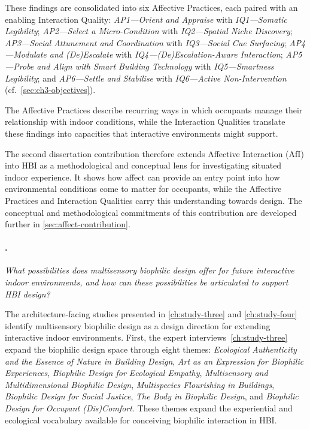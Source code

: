 These findings are consolidated into six Affective Practices, each paired with an enabling Interaction Quality:
\textit{AP1---Orient and Appraise} with
\textit{IQ1---Somatic Legibility};
\textit{AP2---Select a Micro-Condition} with
\textit{IQ2---Spatial Niche Discovery};
\textit{AP3---Social Attunement and Coordination} with
\textit{IQ3---Social Cue Surfacing};
\textit{AP4---Modulate and (De)Escalate} with
\textit{IQ4---(De)Escalation-Aware Interaction};
\textit{AP5---Probe and Align with Smart Building Technology} with
\textit{IQ5---Smartness Legibility}; and
\textit{AP6---Settle and Stabilise} with
\textit{IQ6---Active Non-Intervention} (cf.~\autoref{sec:ch3-objectives}). 

The Affective Practices describe recurring ways in which occupants manage their relationship with indoor conditions, while the Interaction Qualities translate these findings into capacities that interactive environments might support.

The second dissertation contribution therefore extends Affective Interaction (AfI) into HBI as a methodological and conceptual lens for investigating situated indoor experience. It shows how affect can provide an entry point into how environmental conditions come to matter for occupants, while the Affective Practices and Interaction Qualities carry this understanding towards design. The conceptual and methodological commitments of this contribution are developed further in \autoref{sec:affect-contribution}.

\paragraph{.}

\emph{What possibilities does multisensory biophilic design offer for future interactive indoor environments, and how can these possibilities be articulated to support HBI design?}

The architecture-facing studies presented in \autoref{ch:study-three} and \autoref{ch:study-four} identify multisensory biophilic design as a design direction for extending interactive indoor environments. First, the expert interviews~\autoref{ch:study-three} expand the biophilic design space through eight themes: \textit{Ecological Authenticity and the Essence of Nature in Building Design}, \textit{Art as an Expression for Biophilic Experiences}, \textit{Biophilic Design for Ecological Empathy}, \textit{Multisensory and Multidimensional Biophilic Design}, \textit{Multispecies Flourishing in Buildings}, \textit{Biophilic Design for Social Justice}, \textit{The Body in Biophilic Design}, and \textit{Biophilic Design for Occupant (Dis)Comfort}. These themes expand the experiential and ecological vocabulary available for conceiving biophilic interaction in HBI.


